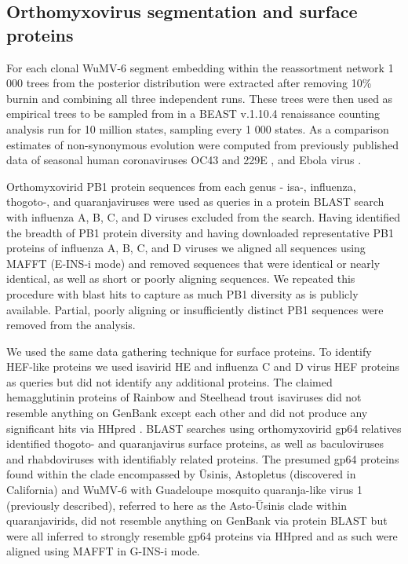 \documentclass[11pt,twocolumn]{article}
\begin{document}
\subsection{Orthomyxovirus segmentation and surface proteins}

For each clonal WuMV-6 segment embedding within the reassortment network 1 000 trees from the posterior distribution were extracted after removing 10\% burnin and combining all three independent runs.
These trees were then used as empirical trees to be sampled from in a BEAST v.1.10.4 \citep{suchard_bayesian_2018} renaissance counting analysis \citep{lemey_counting_2012} run for 10 million states, sampling every 1 000 states.
As a comparison estimates of non-synonymous evolution were computed from previously published data of seasonal human coronaviruses OC43 and 229E \citep{kistler_evidence_2021}, and Ebola virus \citep{park_ebola_2015}.

Orthomyxovirid PB1 protein sequences from each genus - isa-, influenza, thogoto-, and quaranjaviruses were used as queries in a protein BLAST \citep{altschul_basic_1990} search with influenza A, B, C, and D viruses excluded from the search.
Having identified the breadth of PB1 protein diversity and having downloaded representative PB1 proteins of influenza A, B, C, and D viruses we aligned all sequences using MAFFT \citep{katoh_mafft_2005} (E-INS-i mode) and removed sequences that were identical or nearly identical, as well as short or poorly aligning sequences.
We repeated this procedure with blast hits to capture as much PB1 diversity as is publicly available.
Partial, poorly aligning or insufficiently distinct PB1 sequences were removed from the analysis.

We used the same data gathering technique for surface proteins.
To identify HEF-like proteins we used isavirid HE and influenza C and D virus HEF proteins as queries but did not identify any additional proteins.
The claimed hemagglutinin proteins of Rainbow and Steelhead trout isaviruses did not resemble anything on GenBank except each other and did not produce any significant hits via HHpred \citep{finn_hmmer_2011}.
BLAST searches using orthomyxovirid gp64 relatives identified thogoto- and quaranjavirus surface proteins, as well as baculoviruses and rhabdoviruses with identifiably related proteins.
The presumed gp64 proteins found within the clade encompassed by \={U}sinis, Astopletus (discovered in California) and WuMV-6 with Guadeloupe mosquito quaranja-like virus 1 (previously described), referred to here as the Asto-\={U}sinis clade within quaranjavirids, did not resemble anything on GenBank via protein BLAST but were all inferred to strongly resemble gp64 proteins via HHpred and as such were aligned using MAFFT in G-INS-i mode.
\end{document}
